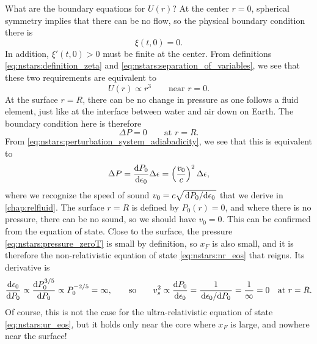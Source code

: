 What are the boundary equations for $U(r)$?
At the center $r = 0$, spherical symmetry implies that there can be no flow, so the physical boundary condition there is
\begin{equation}
	\xi(t, 0) = 0.
\label{eq:nstars:boundary_condition_center_physical}
\end{equation}
In addition, $\xi'(t,0) > 0$ must be finite at the center. \cite{ref:stability_methods}
From definitions \eqref{eq:nstars:definition_zeta} and \eqref{eq:nstars:separation_of_variables}, we see that these two requirements are equivalent to
\begin{equation}
	U(r) \propto r^3
	\qquad \text{near } r = 0.
\label{eq:nstars:boundary_condition_center_mathematical}
\end{equation}
At the surface $r = R$, there can be no change in pressure as one follows a fluid element, just like at the interface between water and air down on Earth.
The boundary condition here is therefore
\begin{equation}
	\Delta P = 0
	\qquad \text{at } r = R.
\label{eq:nstars:boundary_condition_surface_physical}
\end{equation}
From \cref{eq:nstars:perturbation_system_adiabadicity}, we see that this is equivalent to
\begin{equation}
	\Delta P = \odv{P_0}{\epsilon_0} \Delta \epsilon = \left( \frac{v_0}{c} \right)^2 \Delta\epsilon ,
\label{eq:nstars:deltaP_product}
\end{equation}
where we recognize the speed of sound $v_0 = c \sqrt{\odv{P_0}/{\epsilon_0}}$ that we derive in \cref{chap:relfluid}.
The surface $r = R$ is defined by $P_0(r) = 0$, and where there is no pressure, there can be no sound, so we should have $v_0 = 0$.
This can be confirmed from the equation of state.
Close to the surface, the pressure \eqref{eq:nstars:pressure_zeroT} is small by definition, so $x_F$ is also small, and it is therefore the non-relativistic equation of state \eqref{eq:nstars:nr_eos} that reigns.
Its derivative is
\begin{equation}
	\odv{\epsilon_0}{P_0} \propto \odv{P_0^{3/5}}{P_0} \propto P_0^{-2/5} = \infty ,
	\qquad \text{so} \qquad
	v_s^2 \propto \odv{P_0}{\epsilon_0} = \frac{1}{\odv{\epsilon_0}/{P_0}} = \frac{1}{\infty} = 0
	\quad \text{at } r = R.
\end{equation}
Of course, this is not the case for the ultra-relativistic equation of state \eqref{eq:nstars:ur_eos}, but it holds only near the core where $x_F$ is large, and nowhere near the surface!
